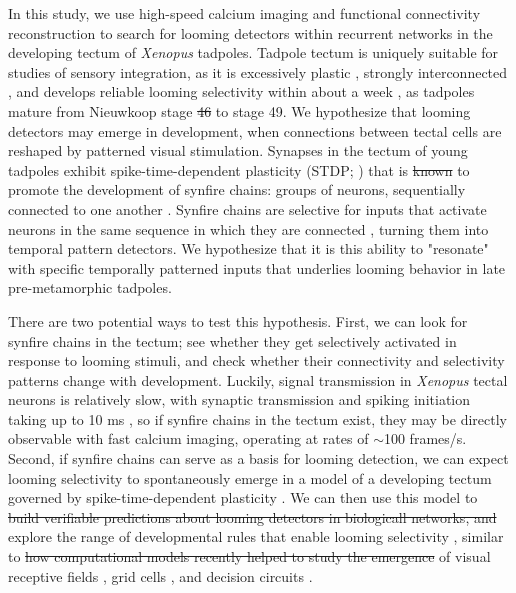 \documentclass{article}
\providecommand{\DIFaddtex}[1]{{\protect\color{blue}{#1}}} %
\providecommand{\DIFdeltex}[1]{{\protect\color{red}\sout{#1}}}                      %
\providecommand{\DIFaddbegin}{} %
\providecommand{\DIFaddend}{} %
\providecommand{\DIFdelbegin}{} %
\providecommand{\DIFdelend}{} %
\providecommand{\DIFadd}[1]{\texorpdfstring{\DIFaddtex{#1}}{#1}} %
\providecommand{\DIFdel}[1]{\texorpdfstring{\DIFdeltex{#1}}{}} %
\newcommand{\DIFscaledelfig}{0.5}
\newlength{\DIFdelgraphicswidth} %
\newlength{\DIFdelgraphicsheight} %
\newcommand{\DIFaddincludegraphics}[2][]{{\color{blue}\fbox{\DIFOincludegraphics[#1]{#2}}}} %
\newcommand{\DIFdelincludegraphics}[2][]{%
\sbox{\DIFdelgraphicsbox}{\DIFOincludegraphics[#1]{#2}}%
\settoboxwidth{\DIFdelgraphicswidth}{\DIFdelgraphicsbox} %
\settoboxtotalheight{\DIFdelgraphicsheight}{\DIFdelgraphicsbox} %
\scalebox{\DIFscaledelfig}{%
\parbox[b]{\DIFdelgraphicswidth}{\usebox{\DIFdelgraphicsbox}\\[-\baselineskip] \rule{\DIFdelgraphicswidth}{0em}}\llap{\resizebox{\DIFdelgraphicswidth}{\DIFdelgraphicsheight}{%
\setlength{\unitlength}{\DIFdelgraphicswidth}%
\begin{picture}(1,1)%
\thicklines\linethickness{2pt} %
{\color[rgb]{1,0,0}\put(0,0){\framebox(1,1){}}}%
{\color[rgb]{1,0,0}\put(0,0){\line( 1,1){1}}}%
{\color[rgb]{1,0,0}\put(0,1){\line(1,-1){1}}}%
\end{picture}%
}\hspace*{3pt}}} %
} %
\DeclareRobustCommand{\DIFaddbegin}{\DIFOaddbegin \let\includegraphics\DIFaddincludegraphics} %
\DeclareRobustCommand{\DIFaddend}{\DIFOaddend \let\includegraphics\DIFOincludegraphics} %
\DeclareRobustCommand{\DIFdelbegin}{\DIFOdelbegin \let\includegraphics\DIFdelincludegraphics} %
\DeclareRobustCommand{\DIFdelend}{\DIFOaddend \let\includegraphics\DIFOincludegraphics} %
\begin{document}
In this study, we use high-speed calcium imaging and functional connectivity reconstruction to search for looming detectors within recurrent networks in the developing tectum of \textit{Xenopus} tadpoles. Tadpole tectum is uniquely suitable for studies of sensory integration, as it is excessively plastic \citep{pratt2007intrinsic, busch2019}, strongly interconnected \citep{james2015}, and develops reliable looming selectivity within about a week \citep{dong2009, khakhalin2014}, as tadpoles mature from Nieuwkoop stage \DIFdelbegin \DIFdel{46 }\DIFdelend \DIFaddbegin \DIFadd{45 }\DIFaddend to stage 49. We hypothesize that looming detectors may emerge in development, when connections between tectal cells are reshaped by patterned visual stimulation. Synapses in the tectum of young tadpoles exhibit spike-time-dependent plasticity (STDP; \citealt{zhang1998stdp, mu2006stdp, vislay2006rf, richards2010stdp}) that is \DIFdelbegin \DIFdel{known }\DIFdelend \DIFaddbegin \DIFadd{expected }\DIFaddend to promote the development of \DIFaddbegin \DIFadd{so-called }\DIFaddend synfire chains: groups of neurons, sequentially connected to one another \citep{fiete2010chains, zheng2014synfire}. Synfire chains are selective for inputs that activate neurons in the same sequence in which they are connected \citep{clopath2010stdpcoding}, turning them into temporal pattern detectors. We hypothesize that it is this ability to "resonate" with specific temporally patterned inputs that underlies looming behavior in late pre-metamorphic tadpoles. 

There are two potential ways to test this hypothesis. First, we can look for synfire chains in the tectum; see whether they get selectively activated in response to looming stimuli, and check whether their connectivity and selectivity patterns change with development. Luckily, signal transmission in \textit{Xenopus} tectal neurons is relatively slow, with synaptic transmission and spiking initiation taking up to 10 ms \citep{ciarleglio2015, jang2016, busch2019}, so if synfire chains in the tectum exist, they may be directly observable with fast calcium imaging, operating at rates of $\sim$100 frames/s. Second, if synfire chains can serve as a basis for looming detection, we can expect looming selectivity to spontaneously emerge in a model of a developing tectum governed by spike-time-dependent plasticity \citep{gao2015simplicity, pietri2017emergence}. We can then use this model to \DIFdelbegin \DIFdel{build verifiable predictions about looming detectors in biologicall networks, and }\DIFdelend explore the range of developmental rules that enable looming selectivity \citep{linderman2017constrain, bassett2018models}, similar to \DIFdelbegin \DIFdel{how computational models recently helped to study the emergence }\DIFdelend \DIFaddbegin \DIFadd{recent advances in modeling the development }\DIFaddend of visual receptive fields \citep{bashivan2018neural}, grid cells \citep{banino2018grid}, and decision circuits \citep{haesemeyer2018convergent}. 
\end{document}

